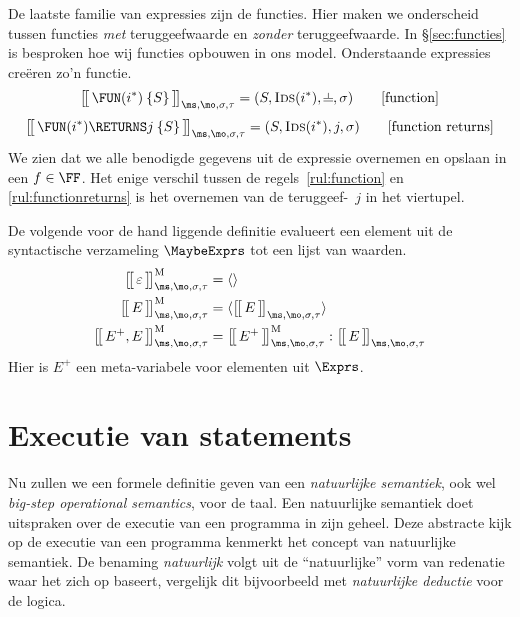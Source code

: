 De laatste familie van expressies zijn de functies. Hier maken we onderscheid tussen functies \emph{met} teruggeefwaarde en \emph{zonder} teruggeefwaarde. In §\ref{sec:functies} is besproken hoe wij functies opbouwen in ons model. Onderstaande expressies creëren zo'n functie.
%
\begin{equation}
  \Express{\FUN (i^*) \: \{S\}}{\ms,\mo,\sigma,\tau} = (S, \textsc{Ids}(i^*), \nil, \sigma)
  \tag*{[function]}\label{rul:function}
\end{equation}
%
\begin{equation}
  \Express{\FUN (i^*) \RETURNS j \: \{S\}}{\ms,\mo,\sigma,\tau} = (S, \textsc{Ids}(i^*), j, \sigma)
  \tag*{[function returns]}\label{rul:functionreturns}
\end{equation}
%
We zien dat we alle benodigde gegevens uit de expressie overnemen en opslaan in een $f\in\FF$. Het enige verschil tussen de regels~\ref{rul:function} en \ref{rul:functionreturns} is het overnemen van de teruggeef-\Id\ $j$ in het viertupel.

De volgende voor de hand liggende definitie evalueert een element uit de syntactische verzameling $\MaybeExprs$ tot een lijst van waarden.
%
\begin{align*}
  \Express[M]{\varepsilon}{\ms,\mo,\sigma,\tau} &= \langle\rangle \\
  \Express[M]{E}{\ms,\mo,\sigma,\tau} &= \langle \Express{E}{\ms,\mo,\sigma,\tau} \rangle \\
  \Express[M]{E^+, E}{\ms,\mo,\sigma,\tau} &= \Express[M]{E^+}{\ms,\mo,\sigma,\tau} : \Express{E}{\ms,\mo,\sigma,\tau}
\end{align*}
%
Hier is $E^+$ een meta-variabele voor elementen uit $\Exprs$.

\section{Executie van statements}

Nu zullen we een formele definitie geven van een \emph{natuurlijke semantiek}, ook wel \emph{big-step operational semantics}, voor de taal. Een natuurlijke semantiek doet uitspraken over de executie van een programma in zijn geheel. Deze abstracte kijk op de executie van een programma kenmerkt het concept van natuurlijke semantiek. De benaming \emph{natuurlijk} volgt uit de ``natuurlijke'' vorm van redenatie waar het zich op baseert, vergelijk dit bijvoorbeeld met \emph{natuurlijke deductie} voor de logica.

